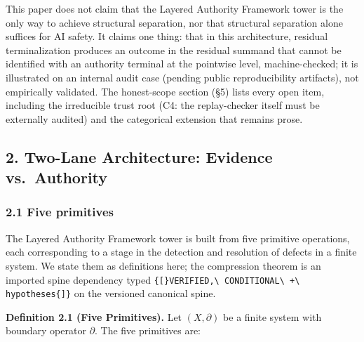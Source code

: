 \documentclass[
  10pt,
]{article}
\DeclareRobustCommand{\texttt}[1]{{\paperSymbolFont\nolinkurl{#1}}}
\begin{document}
This paper does not claim that the Layered Authority Framework tower is the only way to achieve structural separation, nor that structural separation alone suffices for AI safety. It claims one thing: that in this architecture, residual terminalization produces an outcome in the residual summand that cannot be identified with an authority terminal at the pointwise level, machine-checked; it is illustrated on an internal audit case (pending public reproducibility artifacts), not empirically validated. The honest-scope section (§5) lists every open item, including the irreducible trust root (C4: the replay-checker itself must be externally audited) and the categorical extension that remains prose.

\subsection{2. Two-Lane Architecture: Evidence vs.~Authority}\label{two-lane-architecture-evidence-vs.-authority}

\subsubsection{2.1 Five primitives}\label{five-primitives}

The Layered Authority Framework tower is built from five primitive operations, each corresponding to a stage in the detection and resolution of defects in a finite system. We state them as definitions here; the compression theorem is an imported spine dependency typed \texttt{{[}VERIFIED,\ CONDITIONAL\ +\ hypotheses{]}} on the versioned canonical spine.

\textbf{Definition 2.1 (Five Primitives).} Let \protect\hypertarget{math-E0010-0010}{}{\((X, \partial)\)} be a finite system with boundary operator \protect\hypertarget{math-E0011-0011}{}{\(\partial\)}. The five primitives are:
\end{document}
